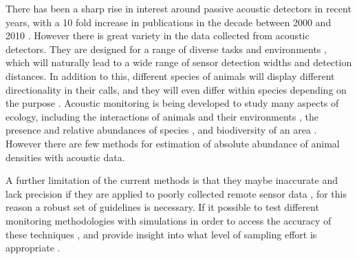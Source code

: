 There has been a sharp rise in interest around passive acoustic detectors in recent years, with a 10 fold increase in publications in the decade between 2000 and 2010 \citep{kessel2014review}. However there is great variety in the data collected from acoustic detectors. They are designed for a range of diverse tasks and environments \citep{kessel2014review}, which will naturally lead to a wide range of sensor detection widths and detection distances. In addition to this, different species of animals will display different directionality in their calls, and they will even differ within species depending on the purpose \citep{jakobsen2012convergent}. Acoustic monitoring is being developed to study many aspects of ecology, including the interactions of animals and their environments \citep{blumstein2011acoustic, straight2014passive, marcoux2011local, rogers2013density}, the presence and relative abundances of species \citep{mckown2012wireless, marcoux2011local}, and biodiversity of an area \citep{ depraetere2012monitoring}. However there are few methods for estimation of absolute abundance of animal densities with acoustic data. 

A further limitation of the current methods is that they maybe inaccurate and lack precision if they are applied to poorly collected remote sensor data \citep{rees2011testing}, for this reason a robust set of guidelines is necessary. If it possible to test different monitoring methodologies with simulations in order to access the accuracy of these techniques \citep{ivan2013using, borchers2008spatially}, and provide insight into what level of sampling effort is appropriate \citep{rees2011testing}. 

